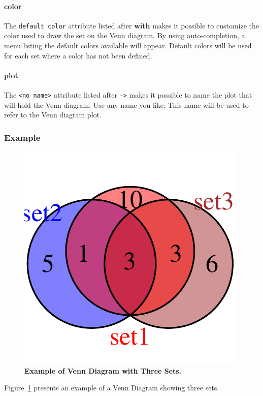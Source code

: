 \paragraph{color}
The \texttt{default color} attribute listed after \textbf{with} makes it possible to customize the color used to draw the set on the Venn diagram. By using auto-completion, a menu listing the default colors available will appear. Default colors will be used for each set where a color has not been defined.

\paragraph{plot}
The \texttt{<no name>} attribute listed after \texttt{->} makes it possible to name the plot that will hold the Venn diagram. Use any name you like. This name will be used to refer to the Venn diagram plot.

\subsubsection{Example}
\begin{figure}[h!tbp]
  \centering
  \includegraphics[scale=0.8]{figures/Venn3Sets.pdf}
\caption[Example of Venn Diagram with Three Sets.]{\textbf{Example of Venn Diagram with Three Sets.}}
\label{fig:Plot3SetsVennDiagram}
\end{figure}

Figure~\ref{fig:Plot3SetsVennDiagram} presents an example of a Venn Diagram showing three sets.


